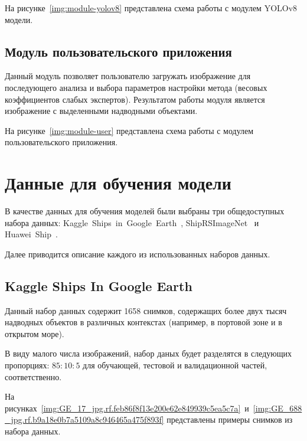 На рисунке~\ref{img:module-yolov8} представлена схема работы с модулем YOLOv8 модели.



\subsection*{Модуль пользовательского приложения}

Данный модуль позволяет пользователю загружать изображение для последующего анализа и выбора параметров настройки метода (весовых коэффициентов слабых экспертов). Результатом работы модуля является изображение с выделенными надводными объектами.

На рисунке~\ref{img:module-user} представлена схема работы с модулем пользовательского приложения.


\section{Данные для обучения модели}

В качестве данных для обучения моделей были выбраны три общедоступных набора данных: Kaggle~Ships~in~Google~Earth~\cite{kaggle-ships-in-google-earth-dfqwt_dataset}, ShipRSImageNet~\cite{shiprs-imagenet} и Huawei~Ship~\cite{huawei_ship_dataset}.

Далее приводится описание каждого из использованных наборов данных.

\subsection*{Kaggle Ships In Google Earth}

Данный набор данных содержит 1658 снимков, содержащих более двух тысяч надводных объектов в различных контекстах (например, в портовой зоне и в открытом море).

В виду малого числа изображений, набор даных будет разделятся в следующих пропорциях: $85:10:5$ для обучающей, тестовой и валидационной частей, соответственно.

На рисунках~\ref{img:GE_17_jpg.rf.feb86f8f13e200e62e849939c5ea5c7a}~и~\ref{img:GE_688_jpg.rf.b9a18e0b7a5109a8c946465a475f893f} представлены примеры снимков из набора данных.



